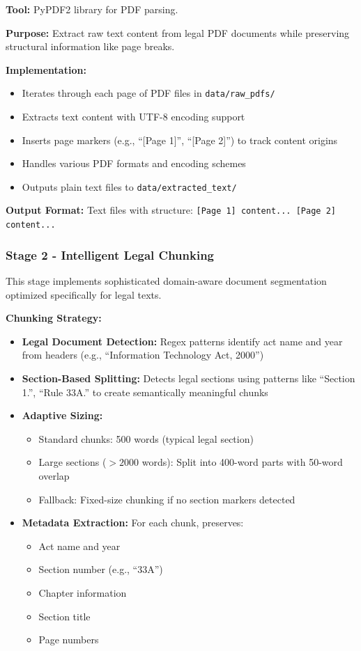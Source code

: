 \documentclass[12pt,a4paper]{article}
\begin{document}
\textbf{Tool:} PyPDF2 library for PDF parsing.

\textbf{Purpose:} Extract raw text content from legal PDF documents while preserving structural information like page breaks.

\textbf{Implementation:}
\begin{itemize}
    \item Iterates through each page of PDF files in \texttt{data/raw\_pdfs/}
    \item Extracts text content with UTF-8 encoding support
    \item Inserts page markers (e.g., ``[Page 1]'', ``[Page 2]'') to track content origins
    \item Handles various PDF formats and encoding schemes
    \item Outputs plain text files to \texttt{data/extracted\_text/}
\end{itemize}

\textbf{Output Format:} Text files with structure: \texttt{[Page 1] content... [Page 2] content...}

\subsubsection{Stage 2 - Intelligent Legal Chunking}

This stage implements sophisticated domain-aware document segmentation optimized specifically for legal texts.

\textbf{Chunking Strategy:}
\begin{itemize}
    \item \textbf{Legal Document Detection:} Regex patterns identify act name and year from headers (e.g., ``Information Technology Act, 2000'')
    \item \textbf{Section-Based Splitting:} Detects legal sections using patterns like ``Section 1.'', ``Rule 33A.'' to create semantically meaningful chunks
    \item \textbf{Adaptive Sizing:}
    \begin{itemize}
        \item Standard chunks: 500 words (typical legal section)
        \item Large sections ($>2000$ words): Split into 400-word parts with 50-word overlap
        \item Fallback: Fixed-size chunking if no section markers detected
    \end{itemize}
    \item \textbf{Metadata Extraction:} For each chunk, preserves:
    \begin{itemize}
        \item Act name and year
        \item Section number (e.g., ``33A'')
        \item Chapter information
        \item Section title
        \item Page numbers
    \end{itemize}
\end{itemize}
\end{document}
